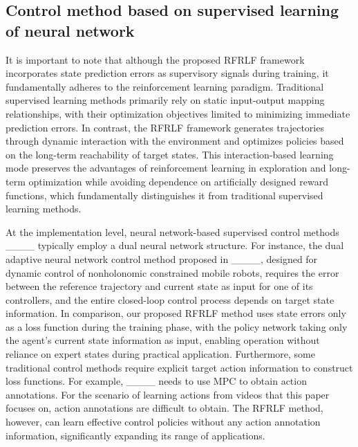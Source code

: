\subsection{Control method based on supervised learning of neural network}
It is important to note that although the proposed RFRLF framework incorporates state prediction errors as supervisory signals during training, it fundamentally adheres to the reinforcement learning paradigm. Traditional supervised learning methods primarily rely on static input-output mapping relationships, with their optimization objectives limited to minimizing immediate prediction errors. In contrast, the RFRLF framework generates trajectories through dynamic interaction with the environment and optimizes policies based on the long-term reachability of target states. This interaction-based learning mode preserves the advantages of reinforcement learning in exploration and long-term optimization while avoiding dependence on artificially designed reward functions, which fundamentally distinguishes it from traditional supervised learning methods.

At the implementation level, neural network-based supervised control methods ____ typically employ a dual neural network structure. For instance, the dual adaptive neural network control method proposed in ____, designed for dynamic control of nonholonomic constrained mobile robots, requires the error between the reference trajectory and current state as input for one of its controllers, and the entire closed-loop control process depends on target state information. In comparison, our proposed RFRLF method uses state errors only as a loss function during the training phase, with the policy network taking only the agent's current state information as input, enabling operation without reliance on expert states during practical application. Furthermore, some traditional control methods require explicit target action information to construct loss functions. For example, ____ needs to use MPC to obtain action annotations. For the scenario of learning actions from videos that this paper focuses on, action annotations are difficult to obtain. The RFRLF method, however, can learn effective control policies without any action annotation information, significantly expanding its range of applications.